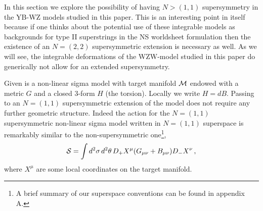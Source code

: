 \documentclass[12pt]{article}
\begin{document}
In this section we explore the possibility of having $N>(1,1)$ supersymmetry in the YB-WZ models studied in this paper. This is an interesting point in itself because if one thinks about the potential use of these integrable models as  backgrounds for type II superstrings in the NS worldsheet formulation then the existence of an $N=(2,2)$ supersymmetric extension is necessary as well. As we will see, the integrable deformations of the WZW-model studied in this paper do generically not allow for an extended supersymmetry.


Given is a non-linear sigma model with target manifold $ {\cal M}$ endowed with a metric $G$ and a closed 3-form $H$ (the torsion). Locally we write $H=dB$. Passing to an $N=(1,1)$ supersymmetric extension of the model does not require any further geometric structure. Indeed the action for the $N=(1,1)$ supersymmetric non-linear sigma model written in $N=(1,1)$ superspace is remarkably similar to the non-supersymmetric one\footnote{A brief summary of our superspace conventions can be found in appendix A.},
\begin{eqnarray}
{\cal S}=\int d^2\sigma  \,d^2\theta \, D_+X^\mu (G_{\mu \nu }+B_{\mu \nu })D_-X^\nu \,,
\end{eqnarray} 
where $X^\mu $ are some local coordinates on the target manifold.
\end{document}
